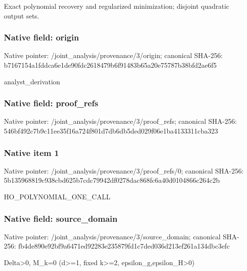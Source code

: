 \documentclass[10pt,a4paper]{article}
\begin{document}
\begingroup\raggedright\sloppy Exact polynomial recovery and regularized minimization;\allowbreak{} disjoint quadratic output sets.\par\endgroup

\subsubsection{Native field: origin}
Native pointer: /joint\_\allowbreak{}analysis/provenance/3/origin; canonical SHA-256: b7167154a1fddca6e1de90fdc2618479b6f91483b65a20e75787b38bfd2ae6f5

\begingroup\raggedright\sloppy analyst\_\allowbreak{}derivation\par\endgroup

\subsubsection{Native field: proof\_\allowbreak{}refs}
Native pointer: /joint\_\allowbreak{}analysis/provenance/3/proof\_\allowbreak{}refs; canonical SHA-256: 546bf492c7b9c11ee35f16a724f801d7db6db5ded029f06e1ba4133311cba323

\subsubsection{Native item 1}
Native pointer: /joint\_\allowbreak{}analysis/provenance/3/proof\_\allowbreak{}refs/0; canonical SHA-256: 5b135968819c938cbd625b7cdc79942df0278dac868fc6a40d0104866c264c2b

\begingroup\raggedright\sloppy HO\_\allowbreak{}POLYNOMIAL\_\allowbreak{}ONE\_\allowbreak{}CALL\par\endgroup

\subsubsection{Native field: source\_\allowbreak{}domain}
Native pointer: /joint\_\allowbreak{}analysis/provenance/3/source\_\allowbreak{}domain; canonical SHA-256: fb4de890e92bf9a6471ed92283e235879fd1c7ded036d213ef261a134dbc3efc

\begingroup\raggedright\sloppy Delta>0,\allowbreak{} M\_\allowbreak{}k=\allowbreak{}0 (d>=\allowbreak{}1,\allowbreak{} fixed k>=\allowbreak{}2,\allowbreak{} epsilon\_\allowbreak{}g,\allowbreak{}epsilon\_\allowbreak{}H>0)\par\endgroup
\end{document}
